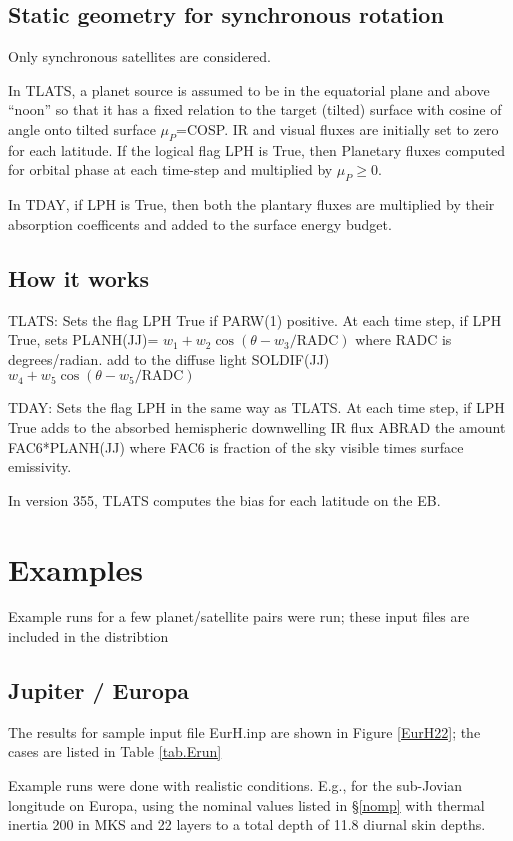 \documentclass{article}
\begin{document}
\subsection{Static geometry for synchronous rotation}
 Only synchronous satellites are considered.

In TLATS, a planet source is assumed to be in the equatorial plane and above
``noon'' so that it has a fixed relation to the target (tilted) surface with
cosine of angle onto tilted surface $\mu_P$=COSP.   IR and visual
fluxes are initially set to zero for each latitude. If the logical flag LPH is
True, then Planetary fluxes computed for orbital phase at each time-step and
multiplied by $\mu_P \geq 0$.

In TDAY, if LPH is True, then both the plantary fluxes are multiplied by their
absorption coefficents and added to the surface energy budget.

\subsection{How it works}
TLATS: Sets the flag LPH True if PARW(1) positive. At each time step, if LPH
True, \qi sets PLANH(JJ)= $ w_1 +w_2 \cos( \theta - w_3/\mathrm{RADC})$ where
RADC is degrees/radian.  
\qi add to the diffuse light SOLDIF(JJ) $ w_4 +w_5\cos( \theta - w_5/\mathrm{RADC})$

TDAY:  Sets the flag LPH in the same way as TLATS.  At each time step, if LPH True
\qi adds to the absorbed hemispheric downwelling IR flux ABRAD the amount FAC6*PLANH(JJ) where FAC6 is fraction of the sky visible times surface emissivity.

In version 355, TLATS computes the bias for each latitude on the EB. 

\section{Examples}

Example runs for a few planet/satellite pairs were run; these input files are included in the distribtion
\subsection{Jupiter / Europa}

The results for sample input file EurH.inp are shown in 
Figure \ref{EurH22}; the cases are listed in Table \ref{tab.Erun} 

Example runs were done with realistic conditions. E.g., for the sub-Jovian
longitude on Europa, using the nominal values listed in \S \ref{nomp} with
thermal inertia 200 in MKS and 22 layers to a total depth of 11.8 diurnal skin
depths. 
\end{document}

